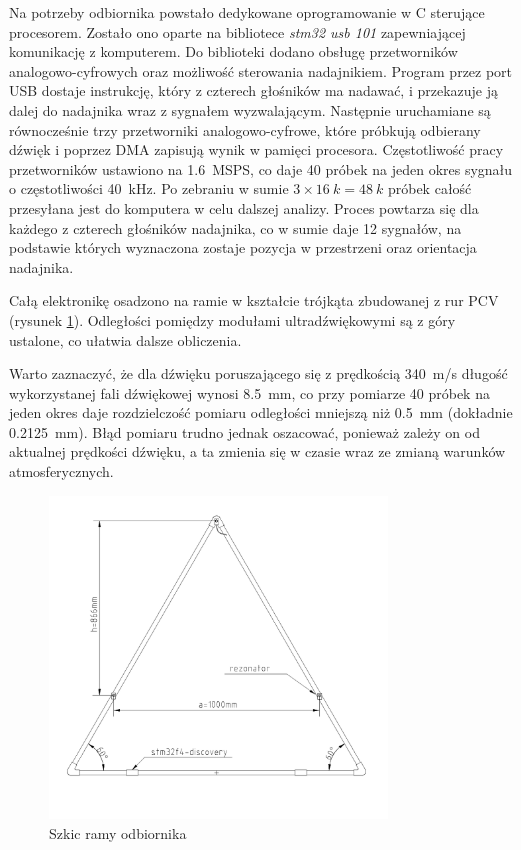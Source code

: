 Na potrzeby odbiornika powstało dedykowane oprogramowanie w C sterujące procesorem.
Zostało ono oparte na bibliotece \textit{stm32 usb 101} \cite{bib:stm32_usb_101} zapewniającej komunikację z komputerem. 
Do biblioteki dodano obsługę przetworników analogowo-cyfrowych oraz możliwość sterowania nadajnikiem.
Program przez port USB dostaje instrukcję, który z czterech głośników ma nadawać, i przekazuje ją
dalej do nadajnika wraz z sygnałem wyzwalającym. Następnie uruchamiane są równocześnie trzy przetworniki analogowo-cyfrowe, które 
próbkują odbierany dźwięk i poprzez DMA zapisują wynik w pamięci procesora.
Częstotliwość pracy przetworników ustawiono na \SI{1,6}{MSPS}, co daje 40 próbek na jeden okres sygnału o częstotliwości \SI{40}{kHz}.
Po zebraniu w sumie $3\times\SI{16}{k}=\SI{48}{k}$ próbek całość przesyłana jest do komputera w celu dalszej analizy.
Proces powtarza się dla każdego z czterech głośników nadajnika, 
co w sumie daje 12 sygnałów, na podstawie których wyznaczona zostaje 
pozycja w przestrzeni oraz orientacja nadajnika.

Całą elektronikę osadzono na ramie w kształcie trójkąta zbudowanej z rur PCV  (rysunek \ref{fig:trojkat}). 
Odległości pomiędzy modułami ultradźwiękowymi są z góry ustalone, co ułatwia dalsze obliczenia.

Warto zaznaczyć, że dla dźwięku poruszającego się z prędkością \SI{340}{m/s} długość wykorzystanej 
fali dźwiękowej wynosi \SI{8.5}{mm}, co przy 
pomiarze 40 próbek na jeden okres daje rozdzielczość pomiaru odległości mniejszą niż \SI{0.5}{mm} (dokładnie \SI{0.2125}{mm}).
Błąd pomiaru trudno jednak oszacować, ponieważ  zależy on od aktualnej prędkości
dźwięku, a ta zmienia się w czasie wraz ze zmianą warunków atmosferycznych.

 \begin{figure}[h]
    \centering
    \includegraphics[width=0.8\textwidth, trim= 0mm 20mm 0mm 0mm,clip]{trojkat}
    \caption{Szkic ramy odbiornika}
    \label{fig:trojkat}
\end{figure}


